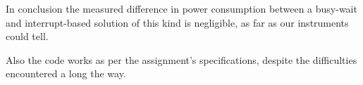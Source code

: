 In conclusion the measured difference in power consumption between a busy-wait and interrupt-based solution of this kind is negligible, as far as our instruments could tell.

Also the code works as per the assignment's specifications, despite the difficulties encountered a long the way.
